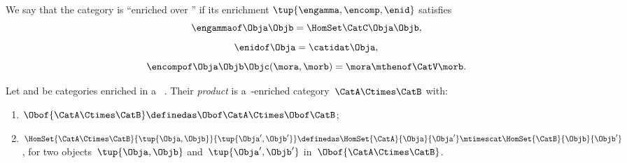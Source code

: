 

\begin{ctdefinition}\label{def:enriched_cat}
    We say that the category \CatC is ``enriched over \CatV'' if its enrichment $\tup{\engamma,\encomp,\enid}$ satisfies
    \begin{equation}
        \engammaof\Obja\Objb = \HomSet\CatC\Obja\Objb,
    \end{equation}
    \begin{equation}
        \enidof\Obja = \catidat\Obja,
    \end{equation}
    \begin{equation}
        \encompof\Obja\Objb\Objc(\mora, \morb) = \mora \mthenof\CatV \morb.
    \end{equation}
\end{ctdefinition}

\begin{definition}
    \label{def:prod_enrich_cat}
    Let \CatA and \CatB be categories enriched in a ~\CatV.
    Their \emph{product} is a~\CatV-enriched category~$\CatA\Ctimes \CatB$ with:
    \begin{enumerate}
        \item $\Obof{\CatA\Ctimes \CatB}\definedas \Obof\CatA \Ctimes \Obof\CatB$;
        \item $\HomSet{\CatA\Ctimes \CatB}{\tup{\Obja,\Objb}}{\tup{\Obja',\Objb'}}\definedas \HomSet{\CatA}{\Obja}{\Obja'}\mtimescat \HomSet{\CatB}{\Objb}{\Objb'}$, for two objects~$\tup{\Obja,\Objb}$ and~$\tup{\Obja',\Objb'}$ in~$\Obof{\CatA\Ctimes \CatB}$.
    \end{enumerate}
\end{definition}


